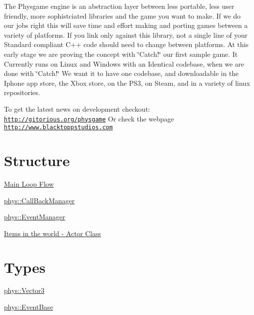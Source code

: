 The Physgame engine is an abstraction layer between less portable, less user friendly, more sophistciated libraries and the game you want to make. If we do our jobs right this will save time and effort making and porting games between a variety of platforms. If you link only against this library, not a single line of your Standard compliant C++ code should need to change between platforms. At this early stage we are proving the concept with \char`\"{}Catch!\char`\"{} our first sample game. It Currently runs on Linux and Windows with an Identical codebase, when we are done with \char`\"{}Catch!\char`\"{} We want it to have one codebase, and downloadable in the Iphone app store, the Xbox store, on the PS3, on Steam, and in a variety of linux repositories.

To get the latest news on development checkout: \href{http://gitorious.org/physgame}{\tt http://gitorious.org/physgame} Or check the webpage \href{http://www.blacktoppstudios.com}{\tt http://www.blacktoppstudios.com}\hypertarget{index_Engine}{}\section{Structure}\label{index_Engine}
\hyperlink{mainloop1}{Main Loop Flow}

\hyperlink{classphys_1_1CallBackManager}{phys::CallBackManager}

\hyperlink{classphys_1_1EventManager}{phys::EventManager}

\hyperlink{classphys_1_1ActorBase}{Items in the world -\/ Actor Class}\hypertarget{index_Data}{}\section{Types}\label{index_Data}
\hyperlink{classphys_1_1Vector3}{phys::Vector3}

\hyperlink{classphys_1_1EventBase}{phys::EventBase} 